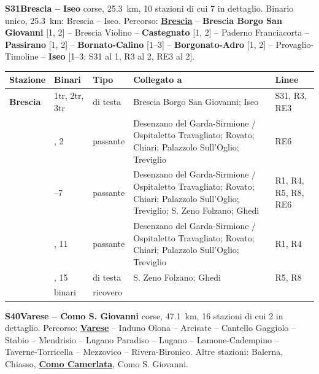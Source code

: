 \medskip\noindent\hypertarget{lin:S31}{\textbf{S31\enspace Brescia -- Iseo}} corse, \SI{25,3}{\km}, 10 stazioni di cui 7 in dettaglio. Binario unico, \SI{25,3}{\km}: Brescia -- Iseo. Percorso: \hyperlink{sta:S09999}{\textbf{Brescia}} -- \hypertarget{sta:S01797}{\textbf{Brescia Borgo San Giovanni}} [1, 2] -- Brescia Violino -- \hypertarget{sta:S01795}{\textbf{Castegnato}} [1, 2] -- Paderno Franciacorta -- \hypertarget{sta:S01793}{\textbf{Passirano}} [1, 2] -- \hypertarget{sta:S01789}{\textbf{Bornato-Calino}} [1--3] -- \hypertarget{sta:S01788}{\textbf{Borgonato-Adro}} [1, 2] -- Provaglio-Timoline -- \hypertarget{sta:S01021}{\textbf{Iseo}} [1--3; S31 al 1, R3 al 2, RE3 al 2].
{\footnotesize\setlength{\LTpre}{2pt}\setlength{\LTpost}{0pt}
\begin{longtable}{@{}>{\raggedright\arraybackslash}p{}>{\raggedright\arraybackslash}p{}>{\raggedright\arraybackslash}p{}>{\raggedright\arraybackslash}p{}>{\raggedright\arraybackslash}p{}@{}}
\toprule
Stazione & Binari & Tipo & Collegato a & Linee \\
\midrule
\endhead
\leavevmode\hypertarget{sta:S09999}{}\textbf{Brescia} & 1tr, 2tr, 3tr & di testa & Brescia Borgo San Giovanni; Iseo & S31, R3, RE3 \\
 & 1, 2 & passante & Desenzano del Garda-Sirmione / Ospitaletto Travagliato; Rovato; Chiari; Palazzolo Sull'Oglio; Treviglio & RE6 \\
 & 3--7 & passante & Desenzano del Garda-Sirmione / Ospitaletto Travagliato; Rovato; Chiari; Palazzolo Sull'Oglio; Treviglio; S. Zeno Folzano; Ghedi & R1, R4, R5, R8, RE6 \\
 & 10, 11 & passante & Desenzano del Garda-Sirmione / Ospitaletto Travagliato; Rovato; Chiari; Palazzolo Sull'Oglio; Treviglio & R1, R4 \\
 & 14, 15 & di testa & S. Zeno Folzano; Ghedi & R5, R8 \\
 & 63 binari & ricovero & & \\
\bottomrule
\end{longtable}}

\medskip\noindent\hypertarget{lin:S40}{\textbf{S40\enspace Varese -- Como S. Giovanni}} corse, \SI{47,1}{\km}, 16 stazioni di cui 2 in dettaglio. Percorso: \hyperlink{sta:S01205}{\textbf{Varese}} -- Induno Olona -- Arcisate -- Cantello Gaggiolo -- Stabio -- Mendrisio -- Lugano Paradiso -- Lugano -- Lamone-Cadempino -- Taverne-Torricella -- Mezzovico -- Rivera-Bironico. Altre stazioni: Balerna, Chiasso, \hyperlink{sta:S09998}{\textbf{Como Camerlata}}, Como S. Giovanni.

